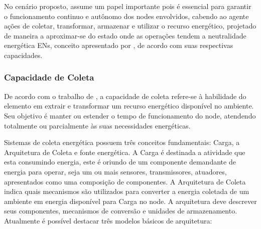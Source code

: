 No cenário proposto, assume um papel importante pois é essencial para garantir o funcionamento continuo e autônomo dos nodes envolvidos, cabendo ao agente ações de coletar, transformar, armazenar e utilizar o recurso energético, projetado de maneira a aproximar-se do estado onde as operações tendem a neutralidade energética \acfp{EN}, conceito apresentado por \cite{kansal_power_2007}, de acordo com suas respectivas capacidades.

\subsubsection{Capacidade de Coleta}
De acordo com o trabalho de \cite{sudevalayam_energy_2011}, a capacidade de coleta refere-se à habilidade do elemento em extrair e transformar um recurso energético disponível no ambiente. Seu objetivo é manter ou estender o tempo de funcionamento do node, atendendo totalmente ou parcialmente às suas necessidades energéticas.

Sistemas de coleta energética possuem três conceitos fundamentais: Carga, a Arquitetura de Coleta e fonte energética. A Carga é destinada a atividade que esta consumindo energia, este é oriundo de um componente demandante de  energia para operar, seja um ou mais sensores, transmissores,  atuadores, apresentados como uma composição de componentes. A Arquitetura de Coleta indica quais mecanismos são utilizados para converter a energia coletada de um ambiente em energia disponível para Carga no node. A arquitetura deve descrever seus componentes, mecanismos de conversão e unidades de armazenamento. Atualmente é possível destacar três modelos básicos de arquitetura:

